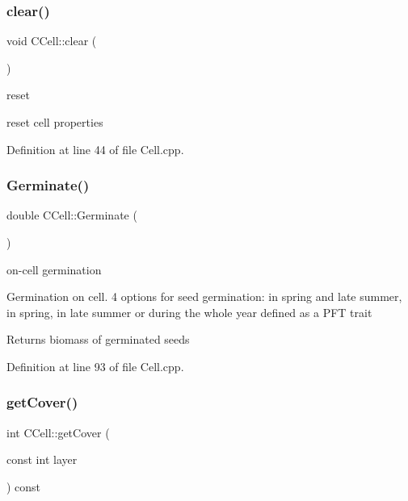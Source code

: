 \mbox{\label{class_c_cell_a8983be7ad0586cbf9b0327761fb5b0f0}} 
\subsubsection{\texorpdfstring{clear()}{clear()}}
{\footnotesize\ttfamily void C\+Cell\+::clear (\begin{DoxyParamCaption}{ }\end{DoxyParamCaption})}



reset 

reset cell properties 

Definition at line 44 of file Cell.\+cpp.

\mbox{\label{class_c_cell_ac1a582012f1d54a21b9b7252d4b06f8f}} 
\subsubsection{\texorpdfstring{Germinate()}{Germinate()}}
{\footnotesize\ttfamily double C\+Cell\+::\+Germinate (\begin{DoxyParamCaption}{ }\end{DoxyParamCaption})}



on-\/cell germination 

Germination on cell. 4 options for seed germination\+: in spring and late summer, in spring, in late summer or during the whole year defined as a P\+FT trait \begin{DoxyReturn}{Returns}
biomass of germinated seeds 
\end{DoxyReturn}


Definition at line 93 of file Cell.\+cpp.

\mbox{\label{class_c_cell_a0b6846606bd1c95525d050ac697e1ae2}} 
\subsubsection{\texorpdfstring{getCover()}{getCover()}\hspace{0.1cm}{\footnotesize\ttfamily [1/2]}}
{\footnotesize\ttfamily int C\+Cell\+::get\+Cover (\begin{DoxyParamCaption}\item[{const int}]{layer }\end{DoxyParamCaption}) const}



